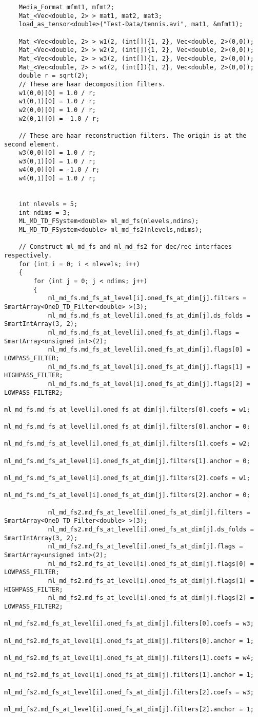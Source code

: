 \documentclass[a4paper,5pt]{article}
\begin{document}
\begin{lstlisting}
	Media_Format mfmt1, mfmt2;
	Mat_<Vec<double, 2> > mat1, mat2, mat3;
	load_as_tensor<double>("Test-Data/tennis.avi", mat1, &mfmt1);

	Mat_<Vec<double, 2> > w1(2, (int[]){1, 2}, Vec<double, 2>(0,0));
	Mat_<Vec<double, 2> > w2(2, (int[]){1, 2}, Vec<double, 2>(0,0));
	Mat_<Vec<double, 2> > w3(2, (int[]){1, 2}, Vec<double, 2>(0,0));
	Mat_<Vec<double, 2> > w4(2, (int[]){1, 2}, Vec<double, 2>(0,0));
	double r = sqrt(2);
	// These are haar decomposition filters.
	w1(0,0)[0] = 1.0 / r;
	w1(0,1)[0] = 1.0 / r;
	w2(0,0)[0] = 1.0 / r;
	w2(0,1)[0] = -1.0 / r;

	// These are haar reconstruction filters. The origin is at the second element.
	w3(0,0)[0] = 1.0 / r;
	w3(0,1)[0] = 1.0 / r;
	w4(0,0)[0] = -1.0 / r;
	w4(0,1)[0] = 1.0 / r;


	int nlevels = 5;
	int ndims = 3;
	ML_MD_TD_FSystem<double> ml_md_fs(nlevels,ndims);
	ML_MD_TD_FSystem<double> ml_md_fs2(nlevels,ndims);

	// Construct ml_md_fs and ml_md_fs2 for dec/rec interfaces respectively.
	for (int i = 0; i < nlevels; i++)
	{
		for (int j = 0; j < ndims; j++)
		{
			ml_md_fs.md_fs_at_level[i].oned_fs_at_dim[j].filters = SmartArray<OneD_TD_Filter<double> >(3);
			ml_md_fs.md_fs_at_level[i].oned_fs_at_dim[j].ds_folds = SmartIntArray(3, 2);
			ml_md_fs.md_fs_at_level[i].oned_fs_at_dim[j].flags = SmartArray<unsigned int>(2);
			ml_md_fs.md_fs_at_level[i].oned_fs_at_dim[j].flags[0] = LOWPASS_FILTER;
			ml_md_fs.md_fs_at_level[i].oned_fs_at_dim[j].flags[1] = HIGHPASS_FILTER;
			ml_md_fs.md_fs_at_level[i].oned_fs_at_dim[j].flags[2] = LOWPASS_FILTER2;
			ml_md_fs.md_fs_at_level[i].oned_fs_at_dim[j].filters[0].coefs = w1;
			ml_md_fs.md_fs_at_level[i].oned_fs_at_dim[j].filters[0].anchor = 0;
			ml_md_fs.md_fs_at_level[i].oned_fs_at_dim[j].filters[1].coefs = w2;
			ml_md_fs.md_fs_at_level[i].oned_fs_at_dim[j].filters[1].anchor = 0;
			ml_md_fs.md_fs_at_level[i].oned_fs_at_dim[j].filters[2].coefs = w1;
			ml_md_fs.md_fs_at_level[i].oned_fs_at_dim[j].filters[2].anchor = 0;

			ml_md_fs2.md_fs_at_level[i].oned_fs_at_dim[j].filters = SmartArray<OneD_TD_Filter<double> >(3);
			ml_md_fs2.md_fs_at_level[i].oned_fs_at_dim[j].ds_folds = SmartIntArray(3, 2);
			ml_md_fs2.md_fs_at_level[i].oned_fs_at_dim[j].flags = SmartArray<unsigned int>(2);
			ml_md_fs2.md_fs_at_level[i].oned_fs_at_dim[j].flags[0] = LOWPASS_FILTER;
			ml_md_fs2.md_fs_at_level[i].oned_fs_at_dim[j].flags[1] = HIGHPASS_FILTER;
			ml_md_fs2.md_fs_at_level[i].oned_fs_at_dim[j].flags[2] = LOWPASS_FILTER2;
			ml_md_fs2.md_fs_at_level[i].oned_fs_at_dim[j].filters[0].coefs = w3;
			ml_md_fs2.md_fs_at_level[i].oned_fs_at_dim[j].filters[0].anchor = 1;
			ml_md_fs2.md_fs_at_level[i].oned_fs_at_dim[j].filters[1].coefs = w4;
			ml_md_fs2.md_fs_at_level[i].oned_fs_at_dim[j].filters[1].anchor = 1;
			ml_md_fs2.md_fs_at_level[i].oned_fs_at_dim[j].filters[2].coefs = w3;
			ml_md_fs2.md_fs_at_level[i].oned_fs_at_dim[j].filters[2].anchor = 1;



\end{lstlisting}
\end{document}
